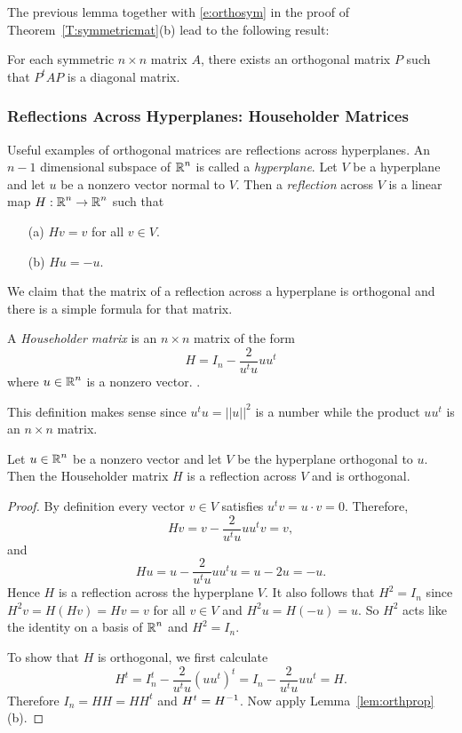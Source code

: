 \documentclass{ximera}
\begin{document}
The previous lemma together with \eqref{e:orthosym} in the proof of
Theorem~\ref{T:symmetricmat}(b) lead to the following result:
\begin{proposition}  For each symmetric $n\times n$ matrix $A$, there exists an
orthogonal matrix $P$ such that $P^tAP$ is a diagonal matrix.
\end{proposition}

\subsubsection*{Reflections Across Hyperplanes: Householder Matrices}

Useful examples of orthogonal matrices are reflections across
hyperplanes.  An $n-1$ dimensional subspace of $\mbox{$\Bbb{R}$}^n$ is called a
{\em hyperplane\/}.  Let $V$ be a hyperplane and let $u$
be a nonzero vector normal to $V$.  Then a
{\em reflection\/} across $V$ is
a linear map $H:\mbox{$\Bbb{R}$}^n\to\mbox{$\Bbb{R}$}^n$ such that
\begin{itemize}
\item[(a)] $Hv=v$ for all $v\in V$.
\item[(b)] $Hu = -u$.
\end{itemize}
We claim that the matrix of a reflection across a hyperplane is orthogonal
and there is a simple formula for that matrix.
\begin{definition} \label{D:Householder}
A {\em Householder matrix\/} is an $n\times n$ matrix of the form
\begin{equation} \label{eq:householder}
H=I_n - \frac{2}{u^tu} u u^t
\end{equation}
where $u\in\mbox{$\Bbb{R}$}^n$ is a nonzero vector. .
\end{definition}
This definition makes sense since $u^tu=||u||^2$ is a number while the
product $u u^t$ is an $n\times n$ matrix.

\begin{lemma}
Let $u\in\mbox{$\Bbb{R}$}^n$ be a nonzero vector and let $V$ be the hyperplane orthogonal
to $u$.  Then the Householder matrix $H$ is a
reflection across $V$ and is orthogonal.
\end{lemma}

\begin{proof}
By definition every vector $v\in V$ satisfies $u^tv=u\cdot v =0$.  Therefore,
\[
Hv = v - \frac{2}{u^tu} u u^tv = v,
\]
and
\[
Hu = u - \frac{2}{u^tu} u u^tu =  u-2u = -u.
\]
Hence $H$ is a reflection across the hyperplane $V$.  It also follows that
$H^2=I_n$ since $H^2v = H(Hv) = Hv = v$ for all $v\in V$ and $H^2u=H(-u)=u$.
So $H^2$ acts like the identity on a basis of $\mbox{$\Bbb{R}$}^n$ and $H^2=I_n$.

To show that $H$ is orthogonal, we first calculate
\[
H^t = I_n^t - \frac{2}{u^tu} (uu^t)^t= I_n - \frac{2}{u^tu}uu^t = H.
\]
Therefore $I_n = H H = HH^t$ and $H^t=H^{-1}$.  Now apply
Lemma~\ref{lem:orthprop}(b).   \end{proof}
\end{document}
